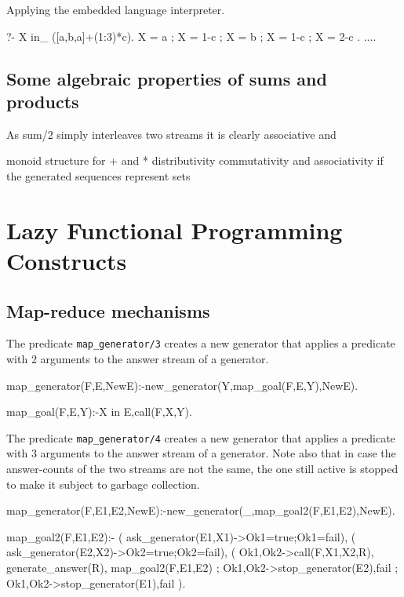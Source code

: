 \documentclass{new_tlp}
\begin{document}
\BX
Applying the embedded language interpreter.
\begin{codex}
?- X in_ ({[a,b,a]}+(1:3)*c).
X = a ;
X = 1-c ;
X = b ;
X = 1-c ;
X = 2-c .
....
\end{codex}
\EX
\subsection{Some algebraic properties of sums and products}

As sum/2 simply interleaves two streams it is clearly associative and 

\BI
\I monoid structure for + and *
\I distributivity
\I commutativity and associativity if the generated sequences represent sets
\EI

\begin{code}
\end{code}

\section{Lazy Functional Programming Constructs}

\subsection{Map-reduce mechanisms}

The predicate {\tt map\_generator/3} creates a new generator that
applies a predicate with 2 arguments to the answer stream  of a generator.
\begin{code}
map_generator(F,E,NewE):-new_generator(Y,map_goal(F,E,Y),NewE).

map_goal(F,E,Y):-X in E,call(F,X,Y).
\end{code}

The predicate {\tt map\_generator/4} creates a new generator that
applies a predicate with 3 arguments to the answer stream  of a generator.
Note also that in case the answer-counts of the two streams are not the same, the one
still active is stopped to make it subject to garbage collection.
\begin{code}
map_generator(F,E1,E2,NewE):-new_generator(_,map_goal2(F,E1,E2),NewE).

map_goal2(F,E1,E2):-
  ( ask_generator(E1,X1)->Ok1=true;Ok1=fail),
  ( ask_generator(E2,X2)->Ok2=true;Ok2=fail),
  ( Ok1,Ok2->call(F,X1,X2,R),
    generate_answer(R),
    map_goal2(F,E1,E2)
  ; \+Ok1,Ok2->stop_generator(E2),fail
  ; Ok1,\+Ok2->stop_generator(E1),fail
  ).
\end{code}
\end{document}
